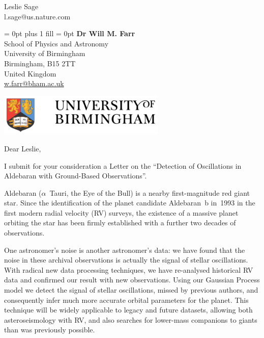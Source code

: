 \documentclass[11pt]{letter} %
\begin{document}
%
\longindentation=0pt                       %
\let\raggedleft\raggedright                %

\nopagebreak  
\begin{letter}
{Leslie Sage \\
l.sage@us.nature.com \\}
      
{
\leftskip = 0pt plus 1 fill
\rightskip = 0pt
\parindent 0pt
%
%
{{\bf Dr Will M. Farr}} \\
School of Physics and Astronomy\\
University of Birmingham\\
Birmingham, B15 2TT\\
United Kingdom\\
 \url{w.farr@bham.ac.uk} \\
 
}


\begin{minipage}[c]{5in}\vskip-4.25cm
\begin{flushleft}
	\begin{minipage}[c]{3cm}
		\begin{flushleft}
			\includegraphics*[width=8cm]{birmingham_logo.png}%
		\end{flushleft}
	\end{minipage}
\end{flushleft}
\end{minipage}

\opening{Dear Leslie,} 
 
\noindent I submit for your consideration a Letter on the ``Detection of Oscillations in Aldebaran with Ground-Based Observations''.

Aldebaran ($\alpha$~Tauri, the Eye of the Bull) is a nearby first-magnitude red giant star. Since the identification of the planet candidate Aldebaran~b in~1993 in the first modern radial velocity (RV) surveys, the existence of a massive planet orbiting the star has been firmly established with a further two decades of observations. 

One astronomer's noise is another astronomer's data: we have found that the noise in these archival observations is actually the signal of stellar oscillations. With radical new data processing techniques, we have re-analysed historical RV data and confirmed our result with new observations. Using our Gaussian Process model we detect the signal of stellar oscillations, missed by previous authors, and consequently infer much more accurate orbital parameters for the planet. This technique will be widely applicable to legacy and future datasets, allowing both asteroseismology with RV, and also searches for lower-mass companions to giants than was previously possible.


\end{letter}
\end{document}
